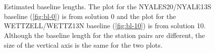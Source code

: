 \documentclass[natbib,twocolumn,twoside]{svmultiag}
\begin{document}
\begin{figure}
	 \\
	 \\
    \caption{Estimated baseline lengths. The plot for the NYALES20/NYALE13S baseline (\ref{fig:bl-0}) is from 
    solution 0 and the plot for
    the WETTZELL/WETTZ13N baseline (\ref{fig:bl-10}) is from solution 10. Although the baseline length for the station pairs are different, the size of the vertical axis is the same for the two plots.}
	\label{fig:bl}
\end{figure}
\end{document}
